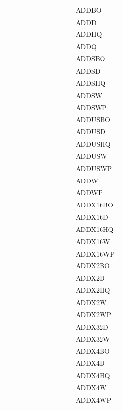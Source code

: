 {\begin{tabular}{|l|l|l|l|l|l|l|l|l|l|l|}
 & & & & & & & & & & \textsf{ADDBO} \\
 & & & & & & & & & & \textsf{ADDD} \\
 & & & & & & & & & & \textsf{ADDHQ} \\
 & & & & & & & & & & \textsf{ADDQ} \\
 & & & & & & & & & & \textsf{ADDSBO} \\
 & & & & & & & & & & \textsf{ADDSD} \\
 & & & & & & & & & & \textsf{ADDSHQ} \\
 & & & & & & & & & & \textsf{ADDSW} \\
 & & & & & & & & & & \textsf{ADDSWP} \\
 & & & & & & & & & & \textsf{ADDUSBO} \\
 & & & & & & & & & & \textsf{ADDUSD} \\
 & & & & & & & & & & \textsf{ADDUSHQ} \\
 & & & & & & & & & & \textsf{ADDUSW} \\
 & & & & & & & & & & \textsf{ADDUSWP} \\
 & & & & & & & & & & \textsf{ADDW} \\
 & & & & & & & & & & \textsf{ADDWP} \\
 & & & & & & & & & & \textsf{ADDX16BO} \\
 & & & & & & & & & & \textsf{ADDX16D} \\
 & & & & & & & & & & \textsf{ADDX16HQ} \\
 & & & & & & & & & & \textsf{ADDX16W} \\
 & & & & & & & & & & \textsf{ADDX16WP} \\
 & & & & & & & & & & \textsf{ADDX2BO} \\
 & & & & & & & & & & \textsf{ADDX2D} \\
 & & & & & & & & & & \textsf{ADDX2HQ} \\
 & & & & & & & & & & \textsf{ADDX2W} \\
 & & & & & & & & & & \textsf{ADDX2WP} \\
 & & & & & & & & & & \textsf{ADDX32D} \\
 & & & & & & & & & & \textsf{ADDX32W} \\
 & & & & & & & & & & \textsf{ADDX4BO} \\
 & & & & & & & & & & \textsf{ADDX4D} \\
 & & & & & & & & & & \textsf{ADDX4HQ} \\
 & & & & & & & & & & \textsf{ADDX4W} \\
 & & & & & & & & & & \textsf{ADDX4WP} \\

\end{tabular}}
